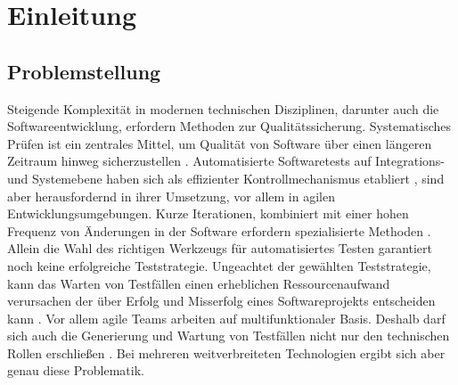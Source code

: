 \chapter{Einleitung}
\label{sec:introduction}

\section{Problemstellung}

Steigende Komplexität in modernen technischen Disziplinen, darunter auch die Softwareentwicklung, erfordern Methoden zur Qualitätssicherung. Systematisches Prüfen ist ein zentrales Mittel, um Qualität von Software über einen längeren Zeitraum hinweg sicherzustellen \cite{spillner_software_2014}. Automatisierte Softwaretests auf Integrations- und Systemebene haben sich als effizienter Kontrollmechanismus etabliert \cite{dustin_software_2000}, sind aber herausfordernd in ihrer Umsetzung, vor allem in agilen Entwicklungsumgebungen. Kurze Iterationen, kombiniert mit einer hohen Frequenz von Änderungen in der Software erfordern spezialisierte Methoden \cite{linz_testing_2014}. Allein die Wahl des richtigen Werkzeugs für automatisiertes Testen garantiert noch keine erfolgreiche Teststrategie. Ungeachtet der gewählten Teststrategie, kann das Warten von Testfällen einen erheblichen Ressourcenaufwand verursachen der über Erfolg und Misserfolg eines Softwareprojekts entscheiden kann \cite{dustin_software_2000}. Vor allem agile Teams arbeiten auf multifunktionaler Basis. Deshalb darf sich auch die Generierung und Wartung von Testfällen nicht nur den technischen Rollen erschließen \cite{linz_testing_2014}. Bei mehreren weitverbreiteten Technologien ergibt sich aber genau diese Problematik.\\

